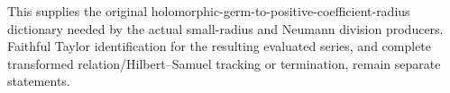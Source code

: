 \begin{remark}
This supplies the original holomorphic-germ-to-positive-coefficient-radius dictionary needed by the actual small-radius and Neumann division producers. Faithful Taylor identification for the resulting evaluated series, and complete transformed relation/Hilbert--Samuel tracking or termination, remain separate statements.
\end{remark}

